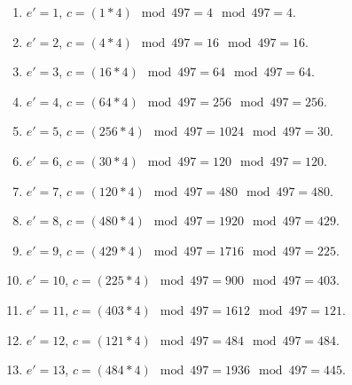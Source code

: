 \begin{enumerate}
\item $e' = 1 $, $c = (1 * 4) \mod 497 = 4 \mod 497 = 4$.
\item $e' = 2 $, $c = (4 * 4) \mod 497 = 16 \mod 497 = 16$.
\item $e' = 3 $, $c = (16 * 4) \mod 497 = 64 \mod 497 = 64$.
\item $e' = 4 $, $c = (64 * 4) \mod 497 = 256 \mod 497 = 256$.
\item $e' = 5 $, $c = (256 * 4) \mod 497 = 1024 \mod 497 = 30$.
\item $e' = 6 $, $c = (30 * 4) \mod 497 = 120 \mod 497 = 120$.
\item $e' = 7 $, $c = (120 * 4) \mod 497 = 480 \mod 497 = 480$.
\item $e' = 8 $, $c = (480 * 4) \mod 497 = 1920 \mod 497 = 429$.
\item $e' = 9 $, $c = (429 * 4) \mod 497 = 1716 \mod 497 = 225$.
\item $e' = 10$, $ c = (225 * 4) \mod 497 = 900 \mod 497 = 403$.
\item $e' = 11$, $ c = (403 * 4) \mod 497 = 1612 \mod 497 = 121$.
\item $e' = 12$, $ c = (121 * 4) \mod 497 = 484 \mod 497 = 484$.
\item $e' = 13$, $ c = (484 * 4) \mod 497 = 1936 \mod 497 = 445$.
\end{enumerate}
